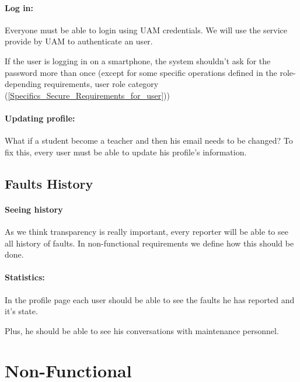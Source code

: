 \paragraph{Log in: } Everyone must be able to login using UAM credentials. We will use the service provide by UAM to authenticate an user.

If the user is logging in on a smartphone, the system shouldn't ask for the password more than once (except for some specific operations defined in the role-depending requirements, user role category (\ref{Specifics_Secure_Requirements_for_user}))

\paragraph{Updating profile: } What if a student become a teacher and then his email needs to be changed? To fix this, every user must be able to update his profile's information. 


\subsection{Faults History}

\paragraph{Seeing history} As we think transparency is really important, every reporter will be able to see all history of faults. In non-functional requirements we define how this should be done. 

\paragraph{Statistics: } In the profile page each user should be able to see the faults he has reported and it's state.

Plus, he should be able to see his conversations with maintenance personnel.


\section{Non-Functional}

